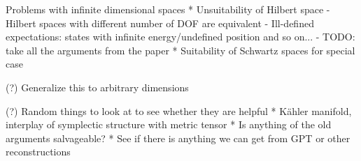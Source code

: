 Problems with infinite dimensional spaces
* Unsuitability of Hilbert space
  - Hilbert spaces with different number of DOF are equivalent
  - Ill-defined expectations: states with infinite energy/undefined position and so on...
  - TODO: take all the arguments from the paper
* Suitability of Schwartz spaces for special case

(?) Generalize this to arbitrary dimensions

(?) Random things to look at to see whether they are helpful
* Kähler manifold, interplay of symplectic structure with metric tensor
* Is anything of the old arguments salvageable?
* See if there is anything we can get from GPT or other reconstructions



  
